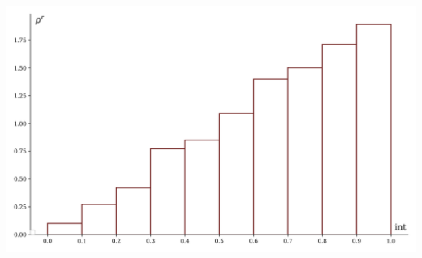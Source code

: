 \documentclass[a4paper, 14pt]{extarticle}
\begin{document}
\begin{minipage}[t]{0.25\textwidth}
\includegraphics[width=\textwidth, height=\textheight, keepaspectratio]{sample20_hist}
\end{minipage}
\end{document}
